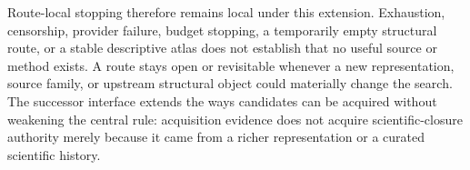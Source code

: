 Route-local stopping therefore remains local under this extension. Exhaustion, censorship, provider failure, budget stopping, a temporarily empty structural route, or a stable descriptive atlas does not establish that no useful source or method exists. A route stays open or revisitable whenever a new representation, source family, or upstream structural object could materially change the search. The successor interface extends the ways candidates can be acquired without weakening the central rule: acquisition evidence does not acquire scientific-closure authority merely because it came from a richer representation or a curated scientific history.
